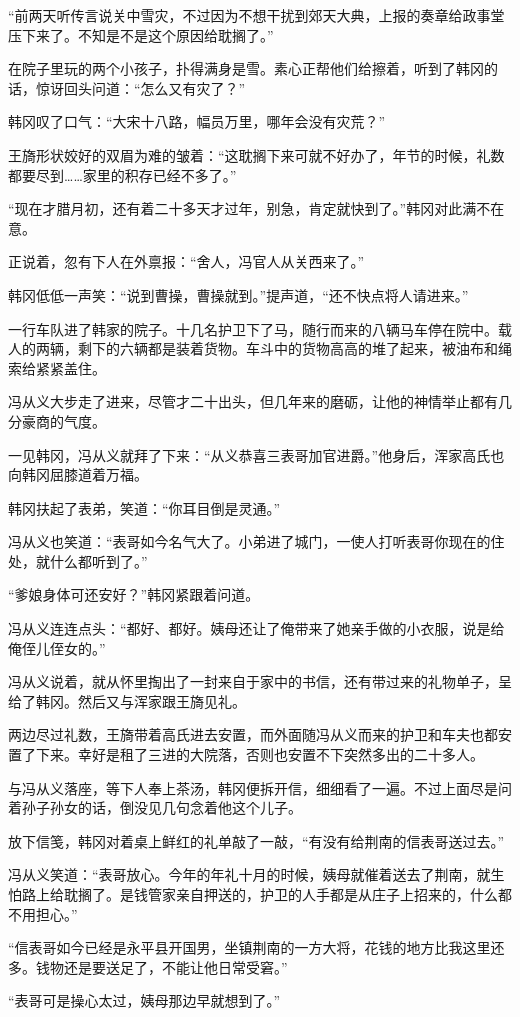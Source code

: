 “前两天听传言说关中雪灾，不过因为不想干扰到郊天大典，上报的奏章给政事堂压下来了。不知是不是这个原因给耽搁了。”

在院子里玩的两个小孩子，扑得满身是雪。素心正帮他们给擦着，听到了韩冈的话，惊讶回头问道：“怎么又有灾了？”

韩冈叹了口气：“大宋十八路，幅员万里，哪年会没有灾荒？”

王旖形状姣好的双眉为难的皱着：“这耽搁下来可就不好办了，年节的时候，礼数都要尽到……家里的积存已经不多了。”

“现在才腊月初，还有着二十多天才过年，别急，肯定就快到了。”韩冈对此满不在意。

正说着，忽有下人在外禀报：“舍人，冯官人从关西来了。”

韩冈低低一声笑：“说到曹操，曹操就到。”提声道，“还不快点将人请进来。”

一行车队进了韩家的院子。十几名护卫下了马，随行而来的八辆马车停在院中。载人的两辆，剩下的六辆都是装着货物。车斗中的货物高高的堆了起来，被油布和绳索给紧紧盖住。

冯从义大步走了进来，尽管才二十出头，但几年来的磨砺，让他的神情举止都有几分豪商的气度。

一见韩冈，冯从义就拜了下来：“从义恭喜三表哥加官进爵。”他身后，浑家高氏也向韩冈屈膝道着万福。

韩冈扶起了表弟，笑道：“你耳目倒是灵通。”

冯从义也笑道：“表哥如今名气大了。小弟进了城门，一使人打听表哥你现在的住处，就什么都听到了。”

“爹娘身体可还安好？”韩冈紧跟着问道。

冯从义连连点头：“都好、都好。姨母还让了俺带来了她亲手做的小衣服，说是给俺侄儿侄女的。”

冯从义说着，就从怀里掏出了一封来自于家中的书信，还有带过来的礼物单子，呈给了韩冈。然后又与浑家跟王旖见礼。

两边尽过礼数，王旖带着高氏进去安置，而外面随冯从义而来的护卫和车夫也都安置了下来。幸好是租了三进的大院落，否则也安置不下突然多出的二十多人。

与冯从义落座，等下人奉上茶汤，韩冈便拆开信，细细看了一遍。不过上面尽是问着孙子孙女的话，倒没见几句念着他这个儿子。

放下信笺，韩冈对着桌上鲜红的礼单敲了一敲，“有没有给荆南的信表哥送过去。”

冯从义笑道：“表哥放心。今年的年礼十月的时候，姨母就催着送去了荆南，就生怕路上给耽搁了。是钱管家亲自押送的，护卫的人手都是从庄子上招来的，什么都不用担心。”

“信表哥如今已经是永平县开国男，坐镇荆南的一方大将，花钱的地方比我这里还多。钱物还是要送足了，不能让他日常受窘。”

“表哥可是操心太过，姨母那边早就想到了。”

